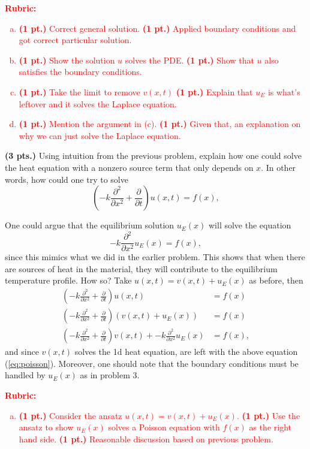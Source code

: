 \documentclass[12pt]{article} %
\begin{document}
\textcolor{red}{
\noindent \textbf{Rubric:}
\begin{enumerate}[(a)]
    \item \textbf{(1 pt.)} Correct general solution. \textbf{(1 pt.)} Applied boundary conditions and got correct particular solution.
	\item \textbf{(1 pt.)} Show the solution $u$ solves the PDE. \textbf{(1 pt.)} Show that $u$ also satisfies the boundary conditions.
    \item \textbf{(1 pt.)} Take the limit to remove $v(x,t)$ \textbf{(1 pt.)} Explain that $u_E$ is what's leftover and it solves the Laplace equation.
	\item \textbf{(1 pt.)} Mention the argument in (c). \textbf{(1 pt.)} Given that, an explanation on why we can just solve the Laplace equation. 
\end{enumerate}
}

\newpage
\begin{problem}
    \textbf{(3 pts.)} Using intuition from the previous problem, explain how one could solve the heat equation with a nonzero source term that only depends on $x$. In other words, how could one try to solve
    \[
    \left( -k \frac{\partial^2}{\partial x^2} + \frac{\partial}{\partial t} \right) u(x,t) = f(x),
    \]
\end{problem}
\begin{solution}
One could argue that the equilibrium solution $u_E(x)$ will solve the equation
\[
-k\frac{\partial^2}{\partial x^2} u_E(x) = f(x),
\]
since this mimics what we did in the earlier problem.  This shows that when there are sources of heat in the material, they will contribute to the equilibrium temperature profile. How so? Take $u(x,t)=v(x,t)+u_E(x)$ as before, then
\begin{align*}
\left( -k \frac{\partial^2}{\partial x^2} + \frac{\partial}{\partial t} \right) u(x,t) &= f(x)\\
\left( -k \frac{\partial^2}{\partial x^2} + \frac{\partial}{\partial t} \right)( v(x,t)+u_E(x)) &= f(x)\\
\left( -k \frac{\partial^2}{\partial x^2} + \frac{\partial}{\partial t} \right) v(x,t) + -k \frac{\partial^2}{\partial x^2} u_E(x) &= f(x),
\end{align*}
and since $v(x,t)$ solves the 1d heat equation, are left with the above equation (\cref{eq:poisson}). Moreover, one should note that the boundary conditions must be handled by $u_E(x)$ as in problem 3.
\end{solution}
\textcolor{red}{
\noindent \textbf{Rubric:}
\begin{enumerate}[(a)]
    \item \textbf{(1 pt.)} Consider the ansatz $u(x,t)=v(x,t)+u_E(x)$. \textbf{(1 pt.)} Use the ansatz to show $u_E(x)$ solves a Poisson equation with $f(x)$ as the right hand side. \textbf{(1 pt.)} Reasonable discussion based on previous problem.
\end{enumerate}
}
\newpage
\end{document}
